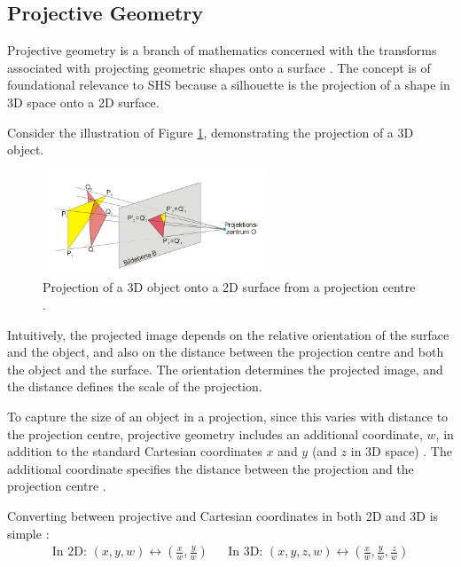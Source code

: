 \subsection{Projective Geometry}

Projective geometry is a branch of mathematics concerned with the transforms associated with projecting geometric shapes onto a surface \cite{artmann_2018}. The concept is of foundational relevance to SHS because a silhouette is the projection of a shape in 3D space onto a 2D surface.

Consider the illustration of Figure \ref{fig:projective_geometry}, demonstrating the projection of a 3D object.

\begin{figure}[ht]
  \centering
  \includegraphics[width=0.6\textwidth]{images/q2_projective_geometry.jpg}
  \caption{Projection of a 3D object onto a 2D surface from a projection centre \cite{baecker_2005}.}
  \label{fig:projective_geometry}
\end{figure}

Intuitively, the projected image depends on the relative orientation of the surface and the object, and also on the distance between the projection centre and both the object and the surface. The orientation determines the projected image, and the distance defines the scale of the projection.

To capture the size of an object in a projection, since this varies with distance to the projection centre, projective geometry includes an additional coordinate, $w$, in addition to the standard Cartesian coordinates $x$ and $y$ (and $z$ in 3D space) \cite{lovell_2023b}. The additional coordinate specifies the distance between the projection and the projection centre \cite{lovell_2023b}.

Converting between projective and Cartesian coordinates in both 2D and 3D is simple \cite{lovell_2023b}:
\begin{align}
  \text{In 2D: } (x, y, w) \longleftrightarrow \left( \frac{x}{w}, \frac{y}{w} \right) &&
  \text{In 3D: } (x, y, z, w) \longleftrightarrow \left( \frac{x}{w}, \frac{y}{w}, \frac{z}{w} \right)
\end{align}

